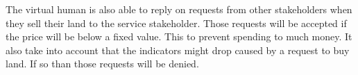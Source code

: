 The virtual human is also able to reply on requests from other stakeholders when they sell their land to the service stakeholder. Those requests will be accepted if the price will be below a fixed value. This to prevent spending to much money. It also take into account that the indicators might drop caused by a request to buy land. If so than those requests will be denied.


\newpage